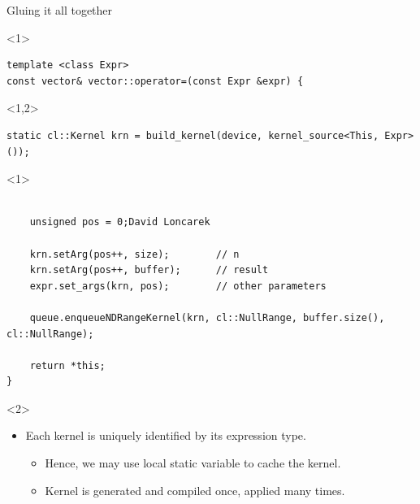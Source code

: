 \documentclass[@BEAMER_OPTIONS@]{beamer}
\begin{document}
\begin{frame}[fragile]{Gluing it all together}
    \begin{exampleblock}{}
        \begin{uncoverenv}<1>
            \begin{lstlisting}
template <class Expr>
const vector& vector::operator=(const Expr &expr) {
            \end{lstlisting}
        \end{uncoverenv}
        \begin{uncoverenv}<1,2>
            \begin{lstlisting}[firstnumber=last]
    static cl::Kernel krn = build_kernel(device, kernel_source<This, Expr>());
            \end{lstlisting}
        \end{uncoverenv}
        \begin{uncoverenv}<1>
            \begin{lstlisting}[firstnumber=last]

    unsigned pos = 0;David Loncarek

    krn.setArg(pos++, size);        // n
    krn.setArg(pos++, buffer);      // result
    expr.set_args(krn, pos);        // other parameters

    queue.enqueueNDRangeKernel(krn, cl::NullRange, buffer.size(), cl::NullRange);

    return *this;
}
            \end{lstlisting}
        \end{uncoverenv}
    \end{exampleblock}
    \begin{uncoverenv}<2>
        \begin{itemize}
            \item Each kernel is uniquely identified by its expression type.
                \begin{itemize}
                    \item Hence, we may use local static variable to cache the
                        kernel.
                    \item Kernel is generated and compiled once, applied many
                        times.
                \end{itemize}
        \end{itemize}
    \end{uncoverenv}
\end{frame}
\end{document}
